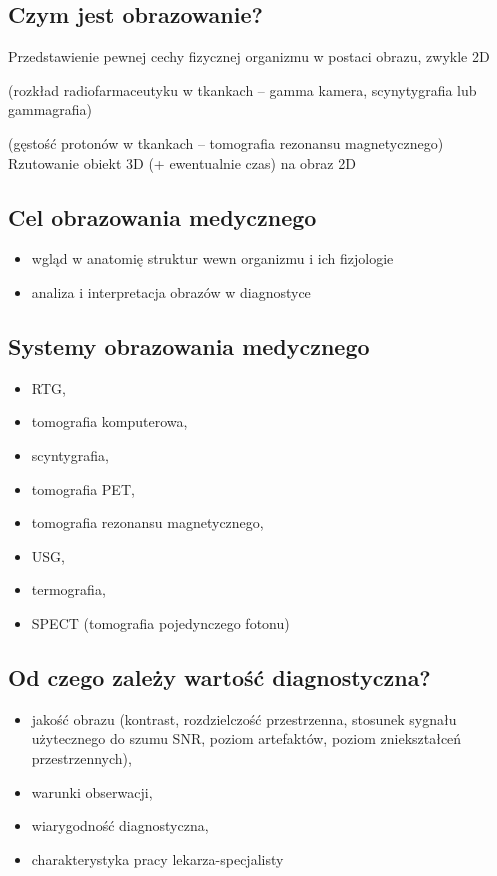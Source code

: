 \documentclass{article}
\begin{document}
\subsection{Czym jest obrazowanie?}

Przedstawienie pewnej cechy fizycznej organizmu w postaci obrazu, zwykle 2D

(rozkład radiofarmaceutyku w tkankach – gamma kamera, scynytygrafia lub gammagrafia)

(gęstość protonów w tkankach – tomografia rezonansu magnetycznego)
Rzutowanie obiekt 3D (+ ewentualnie czas) na obraz 2D

\subsection{Cel obrazowania medycznego}
\begin{itemize}
    \item wgląd w anatomię struktur wewn organizmu i ich fizjologie
    \item analiza i interpretacja obrazów w diagnostyce
\end{itemize}

\subsection{Systemy obrazowania medycznego}

\begin{itemize}
    \item RTG,
    \item tomografia komputerowa,
    \item scyntygrafia, 
    \item tomografia PET, 
    \item tomografia rezonansu magnetycznego, 
    \item USG, 
    \item termografia,
    \item SPECT (tomografia pojedynczego fotonu)
\end{itemize}

\subsection{Od czego zależy wartość diagnostyczna?}

\begin{itemize}
    \item jakość obrazu (kontrast, rozdzielczość przestrzenna, stosunek sygnału użytecznego do szumu SNR, poziom artefaktów, poziom zniekształceń przestrzennych),
    \item warunki obserwacji,
    \item wiarygodność diagnostyczna,
    \item charakterystyka pracy lekarza-specjalisty
\end{itemize}
\end{document}
